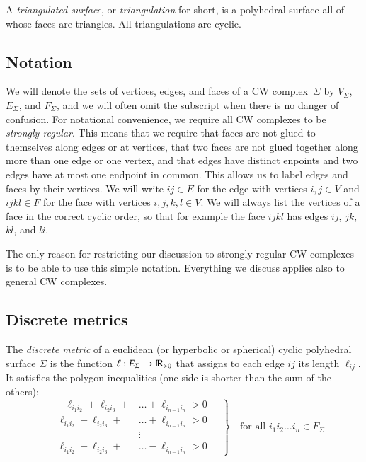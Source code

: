 \documentclass[Thesis.tex]{subfiles}
\begin{document}
  A \emph{triangulated surface}, or \emph{triangulation} for short, is a
  polyhedral surface all of whose faces are triangles.  All
  triangulations are cyclic.

  \subsection{Notation}

  We will denote the sets of vertices, edges, and faces of a CW
  complex~$\Sigma$ by $V_{\Sigma}$, $E_{\Sigma}$, and $F_{\Sigma}$, and
  we will often omit the subscript when there is no danger of confusion.
  For notational convenience, we require all CW complexes to be
  \emph{strongly regular}. This means that we require that faces are not
  glued to themselves along edges or at vertices, that two faces are not
  glued together along more than one edge or one vertex, and that edges
  have distinct enpoints and two edges have at most one endpoint in
  common. This allows us to label edges and faces by their vertices. We
  will write $\mathit{ij}\in E$ for the edge with vertices $i,j\in V$ and
  $\mathit{ijkl}\in F$ for the face with vertices $i,j,k,l\in V$. We will always
  list the vertices of a face in the correct cyclic order, so that for
  example the face $\mathit{ijkl}$ has edges $\mathit{ij}$, $\mathit{jk}$,
  $\mathit{kl}$, and $\mathit{li}$.

  The only reason for restricting our discussion to strongly regular CW
  complexes is to be able to use this simple notation. Everything we
  discuss applies also to general CW complexes.

  \subsection{Discrete metrics}
  \label{sec:discrete-metrics}

  The \emph{discrete metric} of a euclidean (or hyperbolic or
  spherical) cyclic polyhedral surface $\Sigma$ is the function
  $\ell:E_{\Sigma}\rightarrow\mathbb R_{>0}$ that assigns to each edge $ij$ its
  length $\ell_{ij}$. It satisfies the polygon inequalities (one side is
  shorter than the sum of the others):
  \begin{equation}
    \label{eq:polygon_ineq}
    \left.
     \quad
    \begin{aligned}
      -\ell_{i_{1}i_{2}}+\ell_{i_{2}i_{3}}+&\ldots+\ell_{i_{n-1}i_{n}}
      >0\\
      \ell_{i_{1}i_{2}}-\ell_{i_{2}i_{3}}+&\ldots+\ell_{i_{n-1}i_{n}}
      >0\\
      &\vdots\\
      \ell_{i_{1}i_{2}}+\ell_{i_{2}i_{3}}+&\ldots-\ell_{i_{n-1}i_{n}}
      >0
    \end{aligned}
    \quad
    \right\}
    \quad
    \text{for all $i_{1}i_{2}\ldots i_{n}\in F_{\Sigma}$}
  \end{equation}
\end{document}
